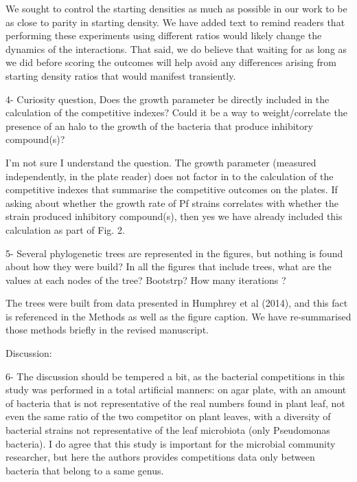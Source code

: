 \documentclass[11pt,]{article}
\begin{document}
We sought to control the starting densities as much as possible in our
work to be as close to parity in starting density. We have added text to
remind readers that performing these experiments using different ratios
would likely change the dynamics of the interactions. That said, we do
believe that waiting for as long as we did before scoring the outcomes
will help avoid any differences arising from starting density ratios
that would manifest transiently.

\begin{blockquote}
4- Curiosity question, Does the growth parameter be directly included in
the calculation of the competitive indexes? Could it be a way to
weight/correlate the presence of an halo to the growth of the bacteria
that produce inhibitory compound(s)?
\end{blockquote}

I'm not sure I understand the question. The growth parameter (measured
independently, in the plate reader) does not factor in to the
calculation of the competitive indexes that summarise the competitive
outcomes on the plates. If asking about whether the growth rate of Pf
strains correlates with whether the strain produced inhibitory
compound(s), then yes we have already included this calculation as part
of Fig. 2.

\begin{blockquote}
5- Several phylogenetic trees are represented in the figures, but
nothing is found about how they were build? In all the figures that
include trees, what are the values at each nodes of the tree? Bootstrp?
How many iterations ?
\end{blockquote}

The trees were built from data presented in Humphrey et al (2014), and
this fact is referenced in the Methods as well as the figure caption. We
have re-summarised those methods briefly in the revised manuscript.

\begin{blockquote}
Discussion:

6- The discussion should be tempered a bit, as the bacterial
competitions in this study was performed in a total artificial manners:
on agar plate, with an amount of bacteria that is not representative of
the real numbers found in plant leaf, not even the same ratio of the two
competitor on plant leaves, with a diversity of bacterial strains not
representative of the leaf microbiota (only Pseudomonas bacteria). I do
agree that this study is important for the microbial community
researcher, but here the authors provides competitions data only between
bacteria that belong to a same genus.
\end{blockquote}
\end{document}
